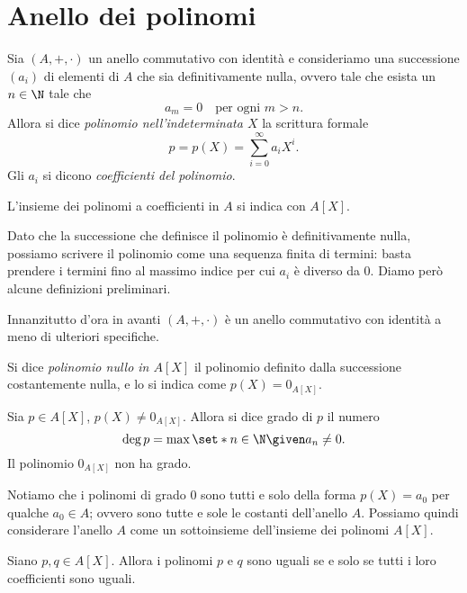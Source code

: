 \section{Anello dei polinomi}

\begin{definition}
    Sia $(A, +, \cdot)$ un anello commutativo con identità e consideriamo una successione $\left(a_i\right)$ di elementi di $A$ che sia definitivamente nulla, ovvero tale che esista un $n \in \N$ tale che \[
        a_m = 0 \quad \text{per ogni } m > n.    
    \]
    Allora si dice \emph{polinomio nell'indeterminata $X$} la scrittura formale \[
        p = p(X) = \sum_{i = 0}^{\infty} a_iX^i.    
    \] Gli $a_i$ si dicono \emph{coefficienti del polinomio}.

    L'insieme dei polinomi a coefficienti in $A$ si indica con $A[X]$.
\end{definition}

Dato che la successione che definisce il polinomio è definitivamente nulla, possiamo scrivere il polinomio come una sequenza finita di termini: basta prendere i termini fino al massimo indice per cui $a_i$ è diverso da $0$. Diamo però alcune definizioni preliminari.

Innanzitutto d'ora in avanti $(A, +, \cdot)$ è un anello commutativo con identità a meno di ulteriori specifiche.

\begin{definition}
    Si dice \emph{polinomio nullo in $A[X]$} il polinomio definito dalla successione costantemente nulla, e lo si indica come $p(X) = 0_{A[X]}$.
\end{definition}

\begin{definition}
    Sia $p \in A[X]$, $p(X) \neq 0_{A[X]}$. Allora si dice grado di $p$ il numero \[
        \deg p = \max \set*{n \in \N \given a_n \neq 0}.    
    \] Il polinomio $0_{A[X]}$ non ha grado.
\end{definition}

Notiamo che i polinomi di grado $0$ sono tutti e solo della forma $p(X) = a_0$ per qualche $a_0 \in A$; ovvero sono tutte e sole le costanti dell'anello $A$. Possiamo quindi considerare l'anello $A$ come un sottoinsieme dell'insieme dei polinomi $A[X]$.

\begin{definition}
    Siano $p, q \in A[X]$. Allora i polinomi $p$ e $q$ sono uguali se e solo se tutti i loro coefficienti sono uguali.
\end{definition}

